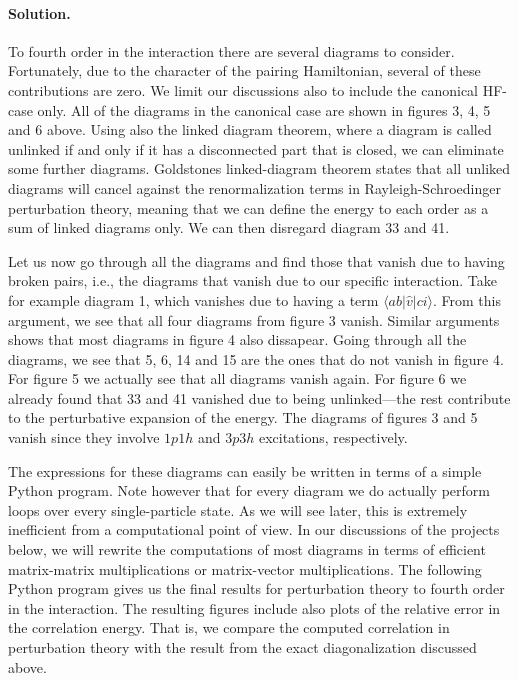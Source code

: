\documentclass[%
twoside,                 %
final,                   %
10pt]{article}
\newenvironment{doconceexercise}{}{}
\begin{document}
\begin{doconceexercise}
\paragraph{Solution.}
To fourth order in the interaction there are several diagrams to consider. 
Fortunately, due to the character of the pairing Hamiltonian, several of these contributions are
zero. We limit our discussions also to include the 
canonical HF-case only. 
All of the diagrams in the canonical case are
shown in figures 3, 4, 5 and 6 above. 
Using also the linked diagram theorem, where a
diagram is called unlinked if and only if it has a disconnected part
that is closed, we can eliminate some further  diagrams. Goldstones
linked-diagram theorem states that all unliked diagrams will cancel
against the renormalization terms in Rayleigh-Schroedinger perturbation theory, 
meaning that we can define
the energy to each order as a sum of linked diagrams
only. We can then disregard diagram 33 and 41.

Let us now go through all the diagrams and find those that vanish due
to having broken pairs, i.e., the diagrams that vanish due to our
specific interaction. Take for example diagram 1, which vanishes due
to having a term $\langle ab\vert \hat{v} \vert ci\rangle$. From this
argument, we see that all four diagrams from figure 3 vanish. Similar
arguments shows that most diagrams in figure 4 also dissapear. Going
through all the diagrams, we see that 5, 6, 14 and 15 are the ones
that do not vanish in figure 4. For figure 5 we actually see that all
diagrams vanish again. For figure 6 we already found that 33 and 41
vanished due to being unlinked---the rest contribute to the perturbative expansion of the 
energy.
The diagrams of figures 3 and 5 vanish since they involve $1p1h$ and $3p3h$ excitations, respectively.

The expressions for these diagrams can easily be written in terms of a
simple Python program. Note however that for every diagram we do
actually perform loops over every single-particle state. As we will
see later, this is extremely inefficient from a computational point
of view. In our discussions of the projects below, we will rewrite the
computations of most diagrams in terms of efficient matrix-matrix
multiplications or matrix-vector multiplications.  The following
Python program gives us the final results for perturbation theory to fourth
order in the interaction. The resulting figures include also plots of the relative error in the
correlation energy. That is, we compare the computed correlation in
perturbation theory with the result from the exact diagonalization discussed above.


\end{doconceexercise}
\end{document}
